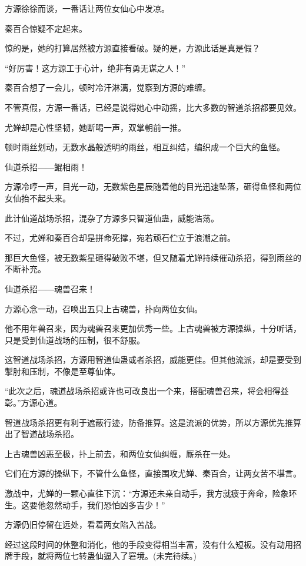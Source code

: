 \begin{this_body}
方源徐徐而谈，一番话让两位女仙心中发凉。

秦百合惊疑不定起来。

惊的是，她的打算居然被方源直接看破。疑的是，方源此话是真是假？

“好厉害！这方源工于心计，绝非有勇无谋之人！”

秦百合想了一会儿，顿时冷汗淋漓，觉察到方源的难缠。

不管真假，方源一番话，已经是说得她心中动摇，比大多数的智道杀招都要见效。

尤婵却是心性坚韧，她断喝一声，双掌朝前一推。

顿时雨丝划动，无数水晶般透明的雨丝，相互纠结，编织成一个巨大的鱼怪。

仙道杀招――鲲相雨！

方源冷哼一声，目光一动，无数紫色星辰随着他的目光迅速坠落，砸得鱼怪和两位女仙抬不起头来。

此计仙道战场杀招，混杂了方源多只智道仙蛊，威能浩荡。

不过，尤婵和秦百合却是拼命死撑，宛若顽石伫立于浪潮之前。

那巨大鱼怪，被无数紫星砸得破败不堪，但又随着尤婵持续催动杀招，得到雨丝的不断补充。

仙道杀招――魂兽召来！

方源心念一动，召唤出五只上古魂兽，扑向两位女仙。

他不用年兽召来，因为魂兽召来更加优秀一些。上古魂兽被方源操纵，十分听话，只是受到仙道战场的压制，很不舒服。

这智道战场杀招，方源用智道仙蛊或者杀招，威能更佳。但其他流派，却是要受到掣肘和压制，不像是至尊仙体。

“此次之后，魂道战场杀招或许也可改良出一个来，搭配魂兽召来，将会相得益彰。”方源心道。

智道战场杀招更有利于遮蔽行迹，防备推算。这是流派的优势，所以方源优先推算出了智道战场杀招。

上古魂兽凶恶至极，扑上前去，和两位女仙纠缠，厮杀在一处。

它们在方源的操纵下，不管什么鱼怪，直接围攻尤婵、秦百合，让两女苦不堪言。

激战中，尤婵的一颗心直往下沉：“方源还未亲自动手，我方就疲于奔命，险象环生。这要他忽然动手，我们恐怕凶多吉少！”

方源仍旧停留在远处，看着两女陷入苦战。

经过这段时间的休整和消化，他的手段变得相当丰富，没有什么短板。没有动用招牌手段，就将两位七转蛊仙逼入了窘境。(未完待续。)

\end{this_body}

